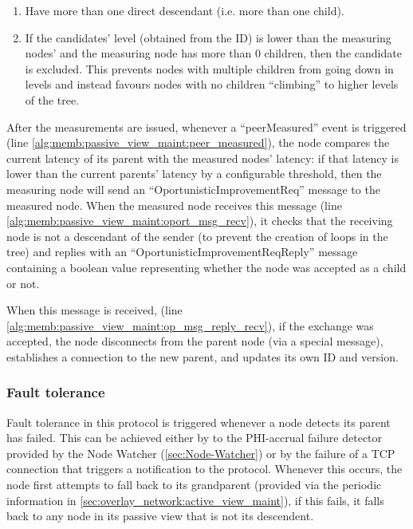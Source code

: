 \begin{enumerate}
    \item Have more than one direct descendant (i.e. more than one child). 
    
    \item If the candidates' level (obtained from the ID) is lower than the measuring nodes' and the measuring node has more than 0 children, then the candidate is excluded. This prevents nodes with multiple children from going down in levels and instead favours nodes with no children ``climbing'' to higher levels of the tree.
\end{enumerate}

After the measurements are issued, whenever a ``peerMeasured'' event is triggered (line \ref{alg:memb:passive_view_maint:peer_measured}), the node compares the current latency of its parent with the measured nodes' latency: if that latency is lower than the current parents' latency by a configurable threshold, then the measuring node will send an ``OportunisticImprovementReq'' message to the measured node. When the measured node receives this message (line \ref{alg:memb:passive_view_maint:oport_msg_recv}), it checks that the receiving node is not a descendant of the sender (to prevent the creation of loops in the tree) and replies with an ``OportunisticImprovementReqReply'' message containing a boolean value representing whether the node was accepted as a child or not.

When this message is received, (line \ref{alg:memb:passive_view_maint:op_msg_reply_recv}), if the exchange was accepted, the node disconnects from the parent node (via a special message), establishes a connection to the new parent, and updates its own ID and version.

\subsubsection{Fault tolerance}

Fault tolerance in this protocol is triggered whenever a node detects its parent has failed. This can be achieved either by to the PHI-accrual failure detector provided by the Node Watcher (\ref{sec:Node-Watcher}) or by the failure of a TCP connection that triggers a notification to the protocol. Whenever this occurs, the node first attempts to fall back to its grandparent (provided via the periodic information in \ref{sec:overlay_network:active_view_maint}), if this fails, it falls back to any node in its passive view that is not its descendent.

